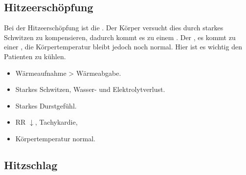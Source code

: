 \subsection{Hitzeerschöpfung}
\label{topic:hitzeerschoepfung}

{
Bei der Hitzeerschöpfung ist die . Der Körper versucht
dies durch starkes Schwitzen zu kompensieren, dadurch kommt 
es zu einem . Der
, es kommt zu einer , die
Körpertemperatur bleibt jedoch noch normal. 
Hier ist es wichtig den Patienten zu
kühlen.
}{
\begin{itemize}
  \item Wärmeaufnahme {\textgreater}  Wärmeabgabe. 
  \item Starkes Schwitzen, Wasser- und  Elektrolytverlust. 
  \item Starkes Durstgefühl. 
  \item RR ${\downarrow}$, Tachykardie, 
  \item Körpertemperatur normal. 
\end{itemize}
}{}{}{}







\subsection{Hitzschlag}
\label{topic:hitzschlag}

